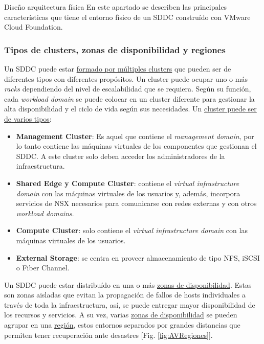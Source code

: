 \begin{subsection}{Diseño arquitectura física}
En este apartado se describen las principales características que tiene el entorno físico de un SDDC construído con VMware Cloud Foundation.
\subsubsection{Tipos de clusters, zonas de disponibilidad y regiones}
Un SDDC puede estar \underline{formado por múltiples clusters} que pueden ser de diferentes tipos con diferentes propósitos. Un cluster puede ocupar uno o más \textit{racks} dependiendo del nivel de escalabilidad que se requiera. Según su función, cada \textit{workload domain} se puede colocar en un cluster diferente para gestionar la alta disponibilidad y el ciclo de vida según sus necesidades. Un \underline{cluster puede ser de varios tipos}:
\begin{itemize}
    \item \textbf{Management Cluster}: Es aquel que contiene el \textit{management domain}, por lo tanto contiene las máquinas virtuales de los componentes que gestionan el SDDC. A este cluster solo deben acceder los administradores de la infraestructura.
    \item \textbf{Shared Edge y Compute Cluster}: contiene el \textit{virtual infrastructure domain} con las máquinas virtuales de los usuarios y, además, incorpora servicios de NSX necesarios para comunicarse con redes externas y con otros \textit{workload domains}.
    \item \textbf{Compute Cluster}: solo contiene el \textit{virtual infrastructure domain} con las máquinas virtuales de los usuarios.
    \item \textbf{External Storage}: se centra en proveer almacenamiento de tipo NFS, iSCSI o Fiber Channel.
\end{itemize}

Un SDDC puede estar distribuído en una o más \underline{zonas de disponibilidad}. Estas son zonas aisladas que evitan la propagación de fallos de hosts individuales a través de toda la infraestructura, así, se puede entregar mayor disponibilidad de los recursos y servicios. A su vez, varias \underline{zonas de disponibilidad} se pueden agrupar en una \underline{región}, estos entornos separados por grandes distancias que permiten tener recuperación ante desastres [Fig. \ref{fig:AVRegiones}].\\


\end{subsection}
